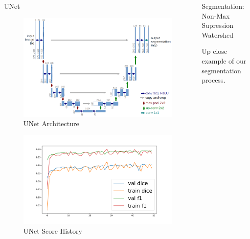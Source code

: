 \documentclass[final]{beamer}
\newlength{\restofpage}
\begin{document}
\begin{frame}[t]
\begin{columns}[t]
\begin{column}{\restofpage}
\begin{columns}[c]
        \begin{block}{UNet} 
              \begin{figure}
                  \centering
                  \includegraphics[width=.6\textwidth]{./figs/unet_architecture.png}
                  \caption{UNet Architecture}
              \end{figure}
              \begin{figure}
                  \centering
                  \includegraphics[width=.7\textwidth]{./figs/unet-score-history.png}
                  \caption{UNet Score History}
              \end{figure}
        \end{block}

        \begin{block}{Segmentation: \newline Non-Max Supression Watershed} 

            \centering
            Up close example of our segmentation process.

\end{block}
\end{columns}
\end{column}
\end{columns}
\end{frame}
\end{document}

